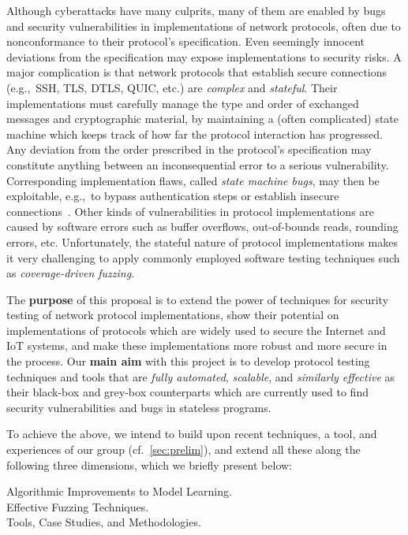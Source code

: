 \documentclass[11pt]{article}
\newcommand{\eg}{e.\/g.,\ }
\begin{document}
Although cyberattacks have many culprits, many of them are enabled by bugs and
security vulnerabilities in implementations of network protocols, often due to
nonconformance to their protocol's specification. Even seemingly innocent
deviations from the specification may expose implementations to security
risks. A major complication is that network protocols that establish secure
connections (\eg SSH, TLS, DTLS, QUIC, etc.) are \emph{complex} and
\emph{stateful}. Their implementations must carefully manage the type and
order of exchanged messages and cryptographic material, by maintaining a
(often complicated) state machine which keeps track of how far the protocol
interaction has progressed. Any deviation from the order prescribed in the
protocol's specification may constitute anything between an inconsequential
error to a serious vulnerability. Corresponding implementation flaws, called
\emph{state machine bugs}, may then be exploitable, \eg to bypass
authentication steps or establish insecure
connections~\cite{MessyTLS@CACM-17,ruiter2015,somorovsky2016,DTLS@USENIX-20}.
Other kinds of vulnerabilities in protocol implementations are caused by
software errors such as buffer overflows, out-of-bounds reads, rounding
errors, etc. Unfortunately, the stateful nature of protocol implementations
makes it very challenging to apply commonly employed software testing
techniques such as \emph{coverage-driven fuzzing}.

The \textbf{purpose} of this proposal is to extend the power of techniques for
security testing of network protocol implementations, show their potential on
implementations of protocols which are widely used to secure the Internet and
IoT systems, and make these implementations more robust and more secure in the
process.
%
Our \textbf{main aim} with this project is to develop protocol testing
techniques and tools that are \emph{fully automated}, \emph{scalable}, and
\emph{similarly effective} as their black-box and grey-box counterparts which
are currently used to find security vulnerabilities and bugs in stateless
programs.

To achieve the above, we intend to build upon recent techniques, a tool, and
experiences of our group (cf.\ \cref{sec:prelim}), and extend all these along
the following three dimensions, which we briefly present below:
\begin{description}
\item[Algorithmic Improvements to Model Learning.]
\item[Effective Fuzzing Techniques.]
\item[Tools, Case Studies, and Methodologies.]
\end{description}
\end{document}
